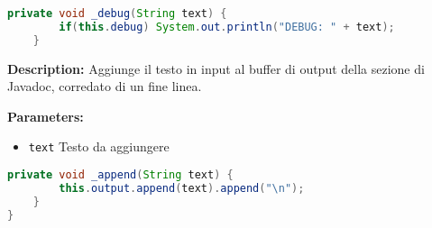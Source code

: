 \documentclass{article}
\begin{document}
\begin{lstlisting}[language=Java]
    private void _debug(String text) {
        if(this.debug) System.out.println("DEBUG: " + text);
    }
\end{lstlisting}
\vspace{0.5cm}
\textbf{Description:}  Aggiunge il testo in input al buffer di output della sezione di Javadoc, corredato di un fine linea. 

\textbf{Parameters:}
\begin{itemize}
  \item\texttt{text} Testo da aggiungere
\end{itemize}

\begin{lstlisting}[language=Java]
    private void _append(String text) {
        this.output.append(text).append("\n");
    }
}
\end{lstlisting}
\end{document}
